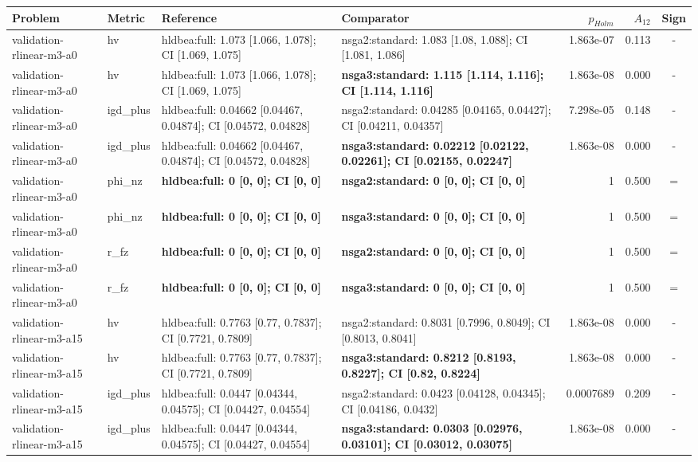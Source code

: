 \begin{tabular}{llllrrc}
\toprule
Problem & Metric & Reference & Comparator & $p_{Holm}$ & $A_{12}$ & Sign \\
\midrule
validation-rlinear-m3-a0 & hv & hldbea:full: 1.073 [1.066, 1.078]; CI [1.069, 1.075] & nsga2:standard: 1.083 [1.08, 1.088]; CI [1.081, 1.086] & 1.863e-07 & 0.113 & - \\
validation-rlinear-m3-a0 & hv & hldbea:full: 1.073 [1.066, 1.078]; CI [1.069, 1.075] & \textbf{nsga3:standard: 1.115 [1.114, 1.116]; CI [1.114, 1.116]} & 1.863e-08 & 0.000 & - \\
validation-rlinear-m3-a0 & igd\_plus & hldbea:full: 0.04662 [0.04467, 0.04874]; CI [0.04572, 0.04828] & nsga2:standard: 0.04285 [0.04165, 0.04427]; CI [0.04211, 0.04357] & 7.298e-05 & 0.148 & - \\
validation-rlinear-m3-a0 & igd\_plus & hldbea:full: 0.04662 [0.04467, 0.04874]; CI [0.04572, 0.04828] & \textbf{nsga3:standard: 0.02212 [0.02122, 0.02261]; CI [0.02155, 0.02247]} & 1.863e-08 & 0.000 & - \\
validation-rlinear-m3-a0 & phi\_nz & \textbf{hldbea:full: 0 [0, 0]; CI [0, 0]} & \textbf{nsga2:standard: 0 [0, 0]; CI [0, 0]} & 1 & 0.500 & = \\
validation-rlinear-m3-a0 & phi\_nz & \textbf{hldbea:full: 0 [0, 0]; CI [0, 0]} & \textbf{nsga3:standard: 0 [0, 0]; CI [0, 0]} & 1 & 0.500 & = \\
validation-rlinear-m3-a0 & r\_fz & \textbf{hldbea:full: 0 [0, 0]; CI [0, 0]} & \textbf{nsga2:standard: 0 [0, 0]; CI [0, 0]} & 1 & 0.500 & = \\
validation-rlinear-m3-a0 & r\_fz & \textbf{hldbea:full: 0 [0, 0]; CI [0, 0]} & \textbf{nsga3:standard: 0 [0, 0]; CI [0, 0]} & 1 & 0.500 & = \\
validation-rlinear-m3-a15 & hv & hldbea:full: 0.7763 [0.77, 0.7837]; CI [0.7721, 0.7809] & nsga2:standard: 0.8031 [0.7996, 0.8049]; CI [0.8013, 0.8041] & 1.863e-08 & 0.000 & - \\
validation-rlinear-m3-a15 & hv & hldbea:full: 0.7763 [0.77, 0.7837]; CI [0.7721, 0.7809] & \textbf{nsga3:standard: 0.8212 [0.8193, 0.8227]; CI [0.82, 0.8224]} & 1.863e-08 & 0.000 & - \\
validation-rlinear-m3-a15 & igd\_plus & hldbea:full: 0.0447 [0.04344, 0.04575]; CI [0.04427, 0.04554] & nsga2:standard: 0.0423 [0.04128, 0.04345]; CI [0.04186, 0.0432] & 0.0007689 & 0.209 & - \\
validation-rlinear-m3-a15 & igd\_plus & hldbea:full: 0.0447 [0.04344, 0.04575]; CI [0.04427, 0.04554] & \textbf{nsga3:standard: 0.0303 [0.02976, 0.03101]; CI [0.03012, 0.03075]} & 1.863e-08 & 0.000 & - \\

\end{tabular}
